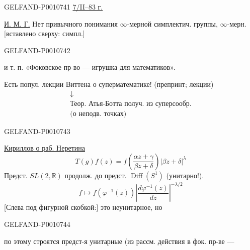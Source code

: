 \begin{GelfandAdjacentEvidence}{GELFAND-P001074}{1}
\uline{7/II–83 г.}


\uline{И. М. Г.} Нет привычного понимания $\infty$-мерной симплектич. группы,
$\infty$-мерн. [вставлено сверху: симпл.]
\end{GelfandAdjacentEvidence}
\begin{GelfandAdjacentEvidence}{GELFAND-P001074}{2}

и т. п. «Фоковское пр-во — игрушка для математиков».

Есть попул. лекции Виттена о суперматематике! (препринт; лекции)
\begin{equation*}
\begin{gathered}
\downarrow\\
\text{Теор. Атья-Ботта получ. из суперсообр.}\\
\text{(о неподв. точках)}
\end{gathered}
\end{equation*}
\end{GelfandAdjacentEvidence}
\begin{GelfandAdjacentEvidence}{GELFAND-P001074}{3}


\uline{Кириллов о раб. Неретина}
\begin{equation*}
T(g)f(z)=f\left(\frac{\alpha z+\gamma}{\beta z+\delta}\right)
|\beta z+\delta|^\lambda
\end{equation*}
Предст. $SL(2,\mathbb R)$ продолж. до предст. $\operatorname{Diff}(S^1)$ (унитарно!).
\begin{equation*}
f\longmapsto f(\varphi^{-1}(z))
\left|\frac{d\varphi^{-1}(z)}{dz}\right|^{-\lambda/2}
\end{equation*}
[Слева под фигурной скобкой:] это неунитарное, но
\end{GelfandAdjacentEvidence}
\begin{GelfandAdjacentEvidence}{GELFAND-P001074}{4}

по этому строятся предст-я унитарные (из рассм. действия в фок. пр-ве —
\end{GelfandAdjacentEvidence}
